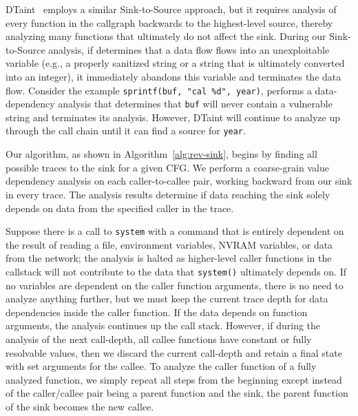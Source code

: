DTaint~\cite{cheng2018dtaint} employs a similar Sink-to-Source approach, but it requires analysis of every function in the callgraph backwards to the highest-level source, thereby analyzing many functions that ultimately do not affect the sink.
During our Sink-to-Source analysis, if \rda determines that a data flow flows into an unexploitable variable (e.g., a properly sanitized string or a string that is ultimately converted into an integer), it immediately abandons this variable and terminates the data flow.
Consider the example \texttt{sprintf(buf, "cal \%d", year)}, \rda performs a data-dependency analysis that determines that \texttt{buf} will never contain a vulnerable string and terminates its analysis.
However, DTaint will continue to analyze up through the call chain until it can find a source for \texttt{year}.

Our \rev algorithm, as shown in Algorithm~\ref{alg:rev-sink}, begins by finding all possible traces to the sink for a given CFG.
We perform a coarse-grain value dependency analysis on each caller-to-callee pair, working backward from our sink in every trace.
The analysis results determine if data reaching the sink solely depends on data from the specified caller in the trace.

Suppose there is a call to \texttt{system} with a command that is entirely dependent on the result of reading a file, environment variables, NVRAM variables, or data from the network; the analysis is halted as higher-level caller functions in the callstack will not contribute to the data that \texttt{system()} ultimately depends on.
If no variables are dependent on the caller function arguments, there is no need to analyze anything further, but we must keep the current trace depth for data dependencies inside the caller function.
If the data depends on function arguments, the analysis continues up the call stack.
However, if during the analysis of the next call-depth, all callee functions have constant or fully resolvable values, then we discard the current call-depth and retain a final state with set arguments for the callee.
To analyze the caller function of a fully analyzed function, we simply repeat all steps from the beginning except instead of the caller/callee pair being a parent function and the sink, the parent function of the sink becomes the new callee.

\begin{code}
    
    \caption{An example of \rev.}
    \label{simplerev}
\end{code}

